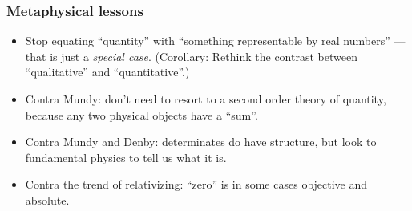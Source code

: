 \documentclass{beamer}
\begin{document}
\begin{frame}\frametitle{Metaphysical lessons}
\begin{itemize}
\item Stop equating ``quantity'' with ``something representable by
  real numbers'' --- that is just a \emph{special case}.  (Corollary:
  Rethink the contrast between ``qualitative'' and ``quantitative''.) \pause
\item Contra Mundy: don't need to resort to a second order theory of
  quantity, because any two physical objects have a ``sum''. \pause
\item Contra Mundy and Denby: determinates do have structure, but look
  to fundamental physics to tell us what it is. \pause
\item Contra the trend of relativizing: ``zero'' is in some cases
  objective and absolute.
\end{itemize}

\end{frame}
\end{document}
